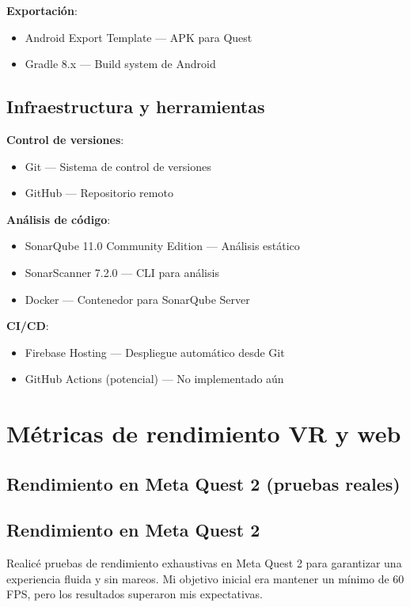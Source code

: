 \textbf{Exportación}:
\begin{itemize}
    \item Android Export Template — APK para Quest
    \item Gradle 8.x — Build system de Android
\end{itemize}

\subsection{Infraestructura y herramientas}

\textbf{Control de versiones}:
\begin{itemize}
    \item Git — Sistema de control de versiones
    \item GitHub — Repositorio remoto
\end{itemize}

\textbf{Análisis de código}:
\begin{itemize}
    \item SonarQube 11.0 Community Edition — Análisis estático
    \item SonarScanner 7.2.0 — CLI para análisis
    \item Docker — Contenedor para SonarQube Server
\end{itemize}

\textbf{CI/CD}:
\begin{itemize}
    \item Firebase Hosting — Despliegue automático desde Git
    \item GitHub Actions (potencial) — No implementado aún
\end{itemize}

\section{Métricas de rendimiento VR y web}

\subsection{Rendimiento en Meta Quest 2 (pruebas reales)}

\subsection{Rendimiento en Meta Quest 2}

Realicé pruebas de rendimiento exhaustivas en Meta Quest 2 para garantizar una experiencia fluida y sin mareos. Mi objetivo inicial era mantener un mínimo de 60 FPS, pero los resultados superaron mis expectativas.

